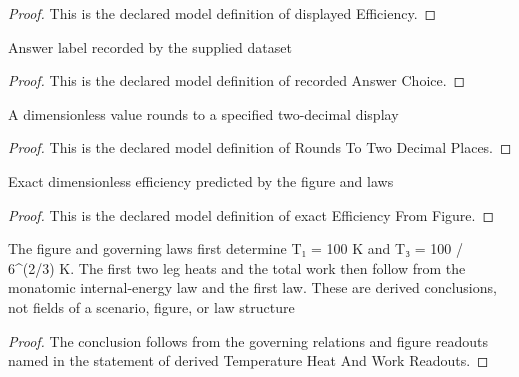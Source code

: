 \begin{proof}
  This is the declared model definition of displayed Efficiency.
\end{proof}
\begin{definition}
  \label{def:physics:phyx-mini-0428:phyxminiproblems-problemphyxmini0428-recordedanswerchoice}
  Answer label recorded by the supplied dataset
\end{definition}
\begin{proof}
  This is the declared model definition of recorded Answer Choice.
\end{proof}
\begin{definition}
  \label{def:physics:phyx-mini-0428:phyxminiproblems-problemphyxmini0428-roundstotwodecimalplaces}
  A dimensionless value rounds to a specified two-decimal display
\end{definition}
\begin{proof}
  This is the declared model definition of Rounds To Two Decimal Places.
\end{proof}
\begin{definition}
  \label{def:physics:phyx-mini-0428:phyxminiproblems-problemphyxmini0428-exactefficiencyfromfigure}
  Exact dimensionless efficiency predicted by the figure and laws
\end{definition}
\begin{proof}
  This is the declared model definition of exact Efficiency From Figure.
\end{proof}
\begin{lemma}
  \label{lem:physics:phyx-mini-0428:phyxminiproblems-problemphyxmini0428-derivedtemperatureheatandworkreadouts}
  The figure and governing laws first determine T₁ = 100 K and T₃ = 100 / 6\textasciicircum{}(2/3) K. The first two leg heats and the total work then follow from the monatomic internal-energy law and the first law. These are derived conclusions, not fields of a scenario, figure, or law structure
\end{lemma}
\begin{proof}
  The conclusion follows from the governing relations and figure readouts named in the statement of derived Temperature Heat And Work Readouts.
\end{proof}
